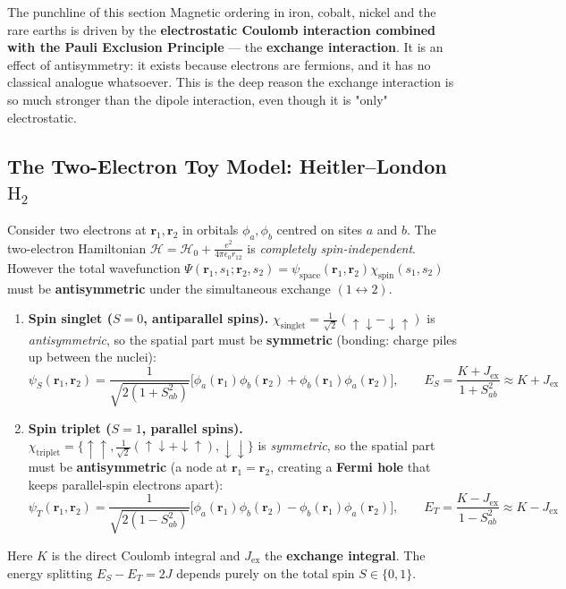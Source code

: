 \documentclass[11pt,a4paper]{article}
\newcommand{\vb}[1]{\mathbf{#1}}
\begin{document}
\begin{takeawaybox}{The punchline of this section}
Magnetic ordering in iron, cobalt, nickel and the rare earths is driven by the \textbf{electrostatic Coulomb interaction combined with the Pauli Exclusion Principle} --- the \textbf{exchange interaction}. It is an effect of antisymmetry: it exists because electrons are fermions, and it has no classical analogue whatsoever. This is the deep reason the exchange interaction is so much stronger than the dipole interaction, even though it is "only" electrostatic.
\end{takeawaybox}

\subsection{The Two-Electron Toy Model: Heitler--London \texorpdfstring{$\text{H}_2$}{H2}}

Consider two electrons at $\vb{r}_1, \vb{r}_2$ in orbitals $\phi_a, \phi_b$ centred on sites $a$ and $b$. The two-electron Hamiltonian $\mathcal{H} = \mathcal{H}_0 + \frac{e^2}{4\pi\epsilon_0 r_{12}}$ is \emph{completely spin-independent}. However the total wavefunction $\Psi(\vb{r}_1,s_1;\vb{r}_2,s_2) = \psi_{\mathrm{space}}(\vb{r}_1,\vb{r}_2)\chi_{\mathrm{spin}}(s_1,s_2)$ must be \textbf{antisymmetric} under the simultaneous exchange $(1\leftrightarrow 2)$.

\begin{enumerate}[leftmargin=1.6cm]
    \item \textbf{Spin singlet ($S = 0$, antiparallel spins).}
    $\chi_{\mathrm{singlet}} = \frac{1}{\sqrt2}(\uparrow\downarrow - \downarrow\uparrow)$ is \emph{antisymmetric}, so the spatial part must be \textbf{symmetric} (bonding: charge piles up between the nuclei):
    \begin{equation}
        \psi_S(\vb{r}_1,\vb{r}_2) = \frac{1}{\sqrt{2(1+S_{ab}^2)}}\Big[\phi_a(\vb{r}_1)\phi_b(\vb{r}_2) + \phi_b(\vb{r}_1)\phi_a(\vb{r}_2)\Big],
        \qquad E_S = \frac{K+J_{\mathrm{ex}}}{1+S_{ab}^2}\approx K+J_{\mathrm{ex}}
        \label{eq:HeitlerS}
    \end{equation}
    \item \textbf{Spin triplet ($S = 1$, parallel spins).}
    $\chi_{\mathrm{triplet}} = \{\uparrow\uparrow, \frac{1}{\sqrt2}(\uparrow\downarrow+\downarrow\uparrow), \downarrow\downarrow\}$ is \emph{symmetric}, so the spatial part must be \textbf{antisymmetric} (a node at $\vb{r}_1=\vb{r}_2$, creating a \textbf{Fermi hole} that keeps parallel-spin electrons apart):
    \begin{equation}
        \psi_T(\vb{r}_1,\vb{r}_2) = \frac{1}{\sqrt{2(1-S_{ab}^2)}}\Big[\phi_a(\vb{r}_1)\phi_b(\vb{r}_2) - \phi_b(\vb{r}_1)\phi_a(\vb{r}_2)\Big],
        \qquad E_T = \frac{K-J_{\mathrm{ex}}}{1-S_{ab}^2}\approx K-J_{\mathrm{ex}}
        \label{eq:HeitlerT}
    \end{equation}
\end{enumerate}
Here $K$ is the direct Coulomb integral and $J_{\mathrm{ex}}$ the \textbf{exchange integral}. The energy splitting $E_S - E_T = 2J$ depends purely on the total spin $S\in\{0,1\}$.
\end{document}
